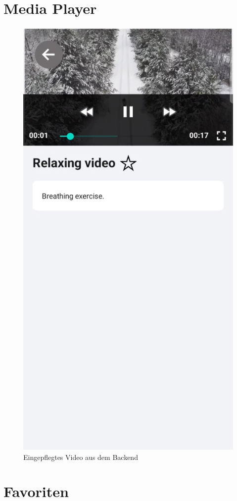 \section{Media Player}

\begin{figure}[H]
    \centering
    \includegraphics[height=\textwidth]{./pics/Media.jpg}
    \caption{Eingepflegtes Video aus dem Backend}
\end{figure}

\section{Favoriten}

